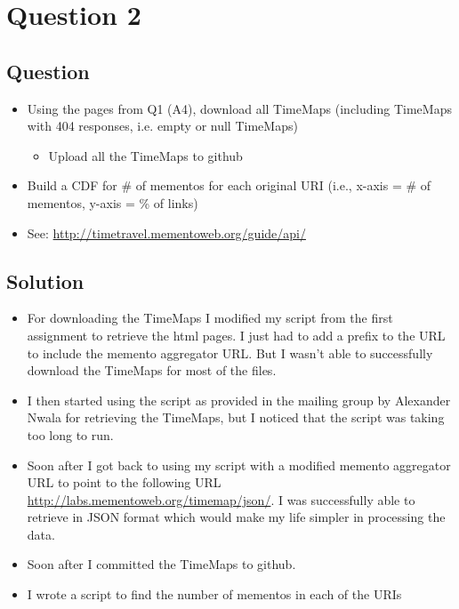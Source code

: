 \chapter{Question 2}
\label{question-2}
\section{Question}



\begin{itemize}
\item Using the pages from Q1 (A4), download all TimeMaps (including TimeMaps with 404 responses, i.e. empty or null TimeMaps)
\begin{itemize}
	\item Upload all the TimeMaps to github
\end{itemize}
\item Build a CDF for \# of mementos for each original URI (i.e., x-axis = \# of mementos, y-axis = \% of links)
\item See: \url{http://timetravel.mementoweb.org/guide/api/}
\end{itemize}

\section{Solution}

\begin{itemize}
\item For downloading the TimeMaps I modified my script from the first assignment to retrieve the html pages. I just had to add a prefix to the URL to include the memento aggregator URL. But I wasn't able to successfully download the TimeMaps for most of the files.
\item I then started using the script as provided in the mailing group by Alexander Nwala for retrieving the TimeMaps, but I noticed that the script was taking too long to run.
\item Soon after I got back to using my script with a modified memento aggregator URL to point to the following URL \url{http://labs.mementoweb.org/timemap/json/}. I was successfully able to retrieve in JSON format which would make my life simpler in processing the data.
\item Soon after I committed the TimeMaps to github.
\item I wrote a script to find the number of mementos in each of the URIs 
\end{itemize}

